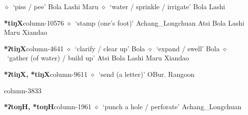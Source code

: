          $\diamond$~`piss / pee'
         Bola 
\hspace{1ex}
         Lashi 
\hspace{1ex}
         Maru 
\hspace{1ex}
         $\diamond$~`water / sprinkle / irrigate'
         Bola 
\hspace{1ex}
         Lashi 
  \item {\footnotesize \textbf{*tiŋX}}{\tiny column-10576}
         $\diamond$~`stamp (one's foot)'
         Achang\_Longchuan 
\hspace{1ex}
         Atsi 
\hspace{1ex}
         Bola 
\hspace{1ex}
         Lashi 
\hspace{1ex}
         Maru 
\hspace{1ex}
         Xiandao 
  \item {\footnotesize \textbf{*ʔtiŋX}}{\tiny column-4641}
         $\diamond$~`clarify / clear up'
         Bola 
\hspace{1ex}
         $\diamond$~`expand / swell'
         Bola 
\hspace{1ex}
         $\diamond$~`gather (of water) / build up'
         Atsi 
\hspace{1ex}
         Bola 
\hspace{1ex}
         Lashi 
\hspace{1ex}
         Maru 
\hspace{1ex}
         Xiandao 
  \item {\footnotesize \textbf{*ʔtiŋX, *tiŋX}}{\tiny column-9611}
         $\diamond$~`send (a letter)'
         OBur. 
\hspace{1ex}
         Rangoon 
  \item {\footnotesize \textbf{}}{\tiny column-3833}
  \item {\footnotesize \textbf{*ʔtoŋH, *toŋH}}{\tiny column-1961}
         $\diamond$~`punch a hole / perforate'
         Achang\_Longchuan 
